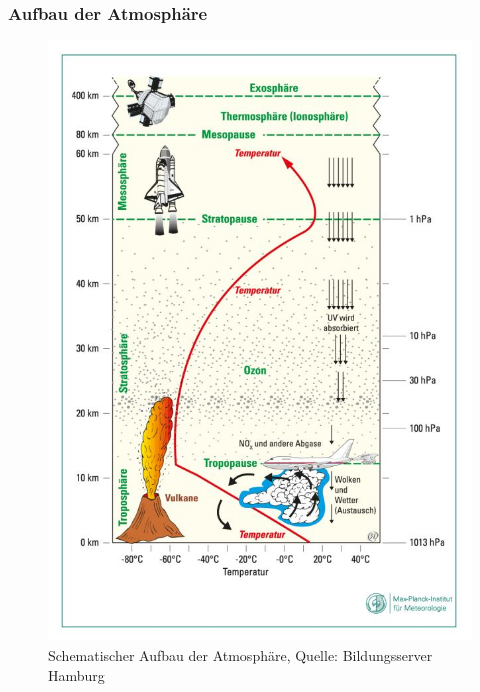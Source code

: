\begin{frame}
	\frametitle{Aufbau der Atmosphäre}
	\begin{figure}
		\centering
		\includegraphics{bilder/atmosphaere-stockwerkaufbau_bildungsserver_hh.jpg}
		\caption{Schematischer Aufbau der Atmosphäre, Quelle: Bildungsserver Hamburg} %
	\end{figure}
\end{frame}


